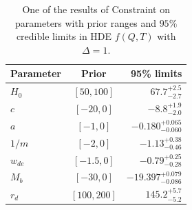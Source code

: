 \documentclass[a4paper,fleqn]{cas-sc}
\begin{document}
\begin{table}[htbp]
    \centering
    \caption{One of the results of Constraint on parameters with prior ranges and $95\%$ credible limits in HDE $f(Q,T)$ with $\Delta=1$.}
    \begin{tabular} { l  c  r}
        \toprule
        Parameter & Prior & 95\% limits\\
        \midrule
        {\boldmath$H_0            $} & $[50, 100]$ & $67.7^{+2.5}_{-2.7}$ \\
        
        {\boldmath$c              $} & $[-20, 0]$ & $-8.8^{+1.9}_{-2.0}$ \\
        
        {\boldmath$a              $} & $[-1, 0]$ & $-0.180^{+0.065}_{-0.060}$ \\
        
        {\boldmath$1/m            $} & $[-2, 0]$ & $-1.13^{+0.38}_{-0.46}$ \\
        
        {\boldmath$w_{de}         $} & $[-1.5, 0]$ & $-0.79^{+0.25}_{-0.28}$ \\
        
        {\boldmath$M_b            $} & $[-30, 0]$ & $-19.397^{+0.079}_{-0.086}$ \\
        
        {\boldmath$r_d            $} & $[100, 200]$ & $145.2^{+5.7}_{-5.2}$ \\
        \bottomrule
    \end{tabular}
    \label{tab:results}
\end{table}
\end{document}
